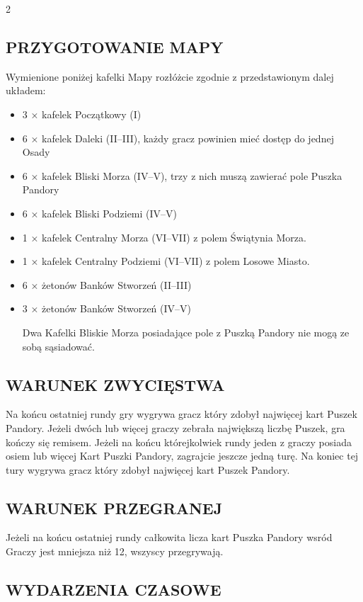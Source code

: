 \begin{multicols*}{2}
\subsection*{\MakeUppercase{PRZYGOTOWANIE MAPY}}

Wymienione poniżej kafelki Mapy rozłóżcie zgodnie z przedstawionym dalej układem:
\begin{itemize}
  \item 3 × kafelek Początkowy (I)
  \item 6 × kafelek Daleki (II--III), każdy gracz powinien mieć dostęp do jednej Osady
  \item 6 × kafelek Bliski Morza (IV--V), trzy z nich muszą zawierać pole Puszka Pandory
  \item 6 × kafelek Bliski Podziemi (IV--V)
  \item 1 × kafelek Centralny Morza (VI--VII) z polem Świątynia Morza.
  \item 1 × kafelek Centralny Podziemi (VI--VII) z polem Losowe Miasto.
  \item 6 × żetonów Banków Stworzeń (II--III) 
  \item 3 × żetonów Banków Stworzeń (IV--V)

Dwa Kafelki Bliskie Morza posiadające pole z Puszką Pandory nie mogą ze sobą sąsiadować.
  
\end{itemize}

\subsection*{\MakeUppercase{WARUNEK ZWYCIĘSTWA}}
Na końcu ostatniej rundy gry wygrywa gracz który zdobył najwięcej kart Puszek Pandory. Jeżeli dwóch lub więcej graczy zebrała największą liczbę Puszek, gra kończy się remisem. Jeżeli na końcu którejkolwiek rundy jeden z graczy posiada osiem lub więcej Kart Puszki Pandory, zagrajcie jeszcze jedną turę. Na koniec tej tury wygrywa gracz który zdobył najwięcej kart Puszek Pandory.

\subsection*{\MakeUppercase{WARUNEK PRZEGRANEJ}}
Jeżeli na końcu ostatniej rundy całkowita licza kart Puszka Pandory wsród Graczy jest mniejsza niż 12, wszyscy przegrywają.
\newpage
\subsection*{\MakeUppercase{WYDARZENIA CZASOWE}}


\end{multicols*}
